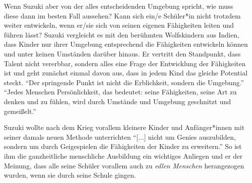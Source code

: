 Wenn Suzuki aber von der alles entscheidenden Umgebung spricht, wie muss diese
dann im besten Fall aussehen? Kann sich ein/e Schüler*in nicht trotzdem weiter
entwickeln, wenn er/sie sich von seinen eigenen Fähigkeiten leiten und führen
lässt? Suzuki vergleicht es mit den berühmten Wolfskindern aus Indien, dass
Kinder nur ihrer Umgebung entsprechend die Fähigkeiten entwickeln können und
unter keinen Umständen darüber hinaus. \autocite[24]{suzuki:erziehung_ist_liebe}
Er vertritt den Standpunkt, dass Talent nicht vererbbar, sondern alles eine Frage
der Entwicklung der Fähigkeiten ist und geht zunächst einmal davon aus, dass in
jedem Kind das gleiche Potential steckt. \enquote{Der springende Punkt ist nicht
die Erblichkeit, sondern die Umgebung.}
\autocite[24]{suzuki:erziehung_ist_liebe} \enquote{Jedes Menschen
Persönlichkeit, das bedeutet: seine Fähigkeiten, seine Art zu denken und zu
fühlen, wird durch Umstände und Umgebung geschnitzt und gemeißelt.}
\autocite[20]{suzuki:erziehung_ist_liebe}

Suzuki wollte nach dem Krieg vorallem kleinere Kinder und Anfänger*innen mit
seiner damals neuen Methode unterrichten \enquote{[...] nicht um Genies
auszubilden, sondern um durch Geigespielen die Fähigkeiten der Kinder zu
erweitern.} \autocite[43]{suzuki:erziehung_ist_liebe} So ist ihm die
ganzheitliche menschliche Ausbildung ein wichtiges Anliegen und er der Meinung,
dass alle seine Schüler vorallem auch zu \emph{edlen Menschen} herangezogen
wurden, wenn sie durch seine Schule gingen. 










